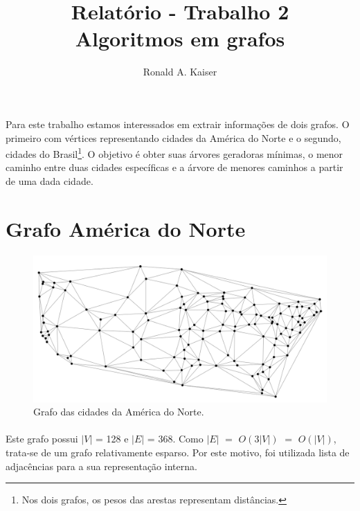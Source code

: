 \documentclass[11pt,a4paper]{article}
\title{Relatório - Trabalho 2 \\ Algoritmos em grafos}
\author{Ronald A. Kaiser}
\begin{document}
    \maketitle

    \paragraph{}
    Para este trabalho estamos interessados em extrair informações de dois grafos. O primeiro com vértices representando cidades da América do Norte e o segundo, cidades do Brasil\footnote{Nos dois grafos, os pesos das arestas representam distâncias.}. O objetivo é obter suas árvores geradoras mínimas, o menor caminho entre duas cidades específicas e a árvore de menores caminhos a partir de uma dada cidade. 
    
    \section{Grafo América do Norte}

        \begin{figure}[htb!]
          \begin{center}
              \includegraphics[scale=0.5]{map}
          \end{center}
              \label{fig:map}
              \caption{Grafo das cidades da América do Norte.}
        \end{figure}

        \paragraph{}
        Este grafo possui ${|V|}$ = 128 e ${|E|}$ = 368. Como ${|E|}$ $=$ ${O(3|V|)}$ $=$ ${O(|V|)}$, trata-se de um grafo relativamente esparso. Por este motivo, foi utilizada lista de adjacências para a sua representação interna.
\end{document}
